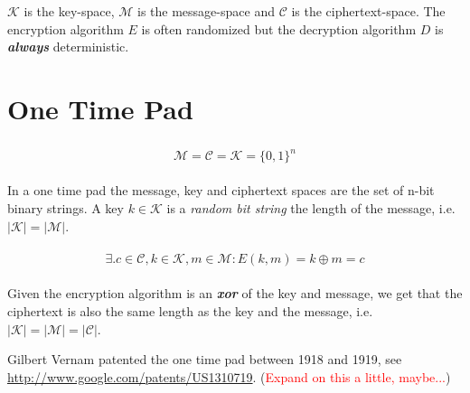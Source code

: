 \documentclass[11pt,a4paper]{report}
\newcommand\todo[1]{\noindent\textcolor{red}{#1}}
\begin{document}
\noindent
$\mathscr{K}$ is the key-space, $\mathscr{M}$ is the message-space and $\mathscr{C}$ is the ciphertext-space. The encryption algorithm $E$ is often randomized but the decryption algorithm $D$ is \emph{\textbf{always}} deterministic.

\section{One Time Pad\textsuperscript{\cite{1}}}

\begin{gather}
	\begin{gathered}
		\mathscr{M} = \mathscr{C} = \mathscr{K} = \{0,1\}^n			
	\end{gathered}	
\end{gather}

\noindent
In a one time pad the message, key and ciphertext spaces are the set of n-bit binary strings. A key $k \in \mathscr{K}$ is a \emph{random bit string} the length of the message, i.e. $|\mathscr{K}|=|\mathscr{M}|$.

\begin{gather}
	\begin{gathered}
		\exists. c \in \mathscr{C}, k \in \mathscr{K}, m \in \mathscr{M}: E(k, m) = k \oplus m = c
	\end{gathered}	
\end{gather}

\noindent
Given the encryption algorithm is an \emph{\textbf{xor}} of the key and message, we get that the ciphertext is also the same length as the key and the message, i.e. $|\mathscr{K}|=|\mathscr{M}|=|\mathscr{C}|$.

\begin{thebibliography}{9} 
	 Gilbert Vernam patented the one time pad between 1918 and 1919, see \url{http://www.google.com/patents/US1310719}. (\todo{Expand on this a little, maybe...})
\end{thebibliography}
\end{document}
